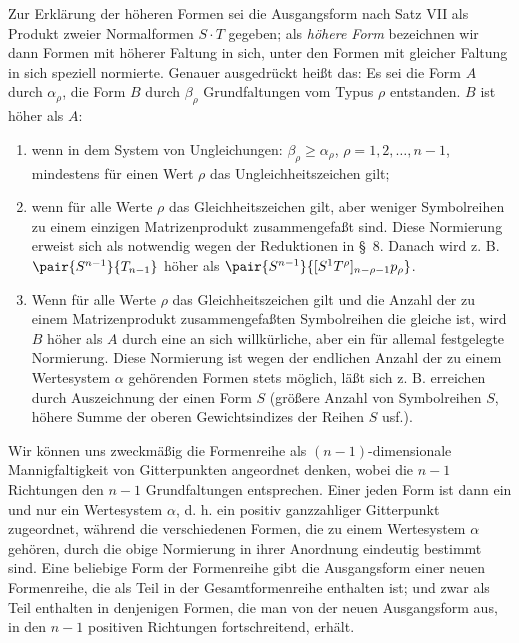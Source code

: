 Zur Erkl\"arung der h\"oheren Formen sei die Ausgangsform nach Satz VII als Produkt zweier Normalformen $S\cdot T$ gegeben; als \emph{h\"ohere Form} bezeichnen wir dann Formen mit h\"oherer Faltung in sich, unter den Formen mit gleicher Faltung in sich speziell normierte. Genauer ausgedr\"uckt hei\ss t das: Es sei die Form $A$ durch $\alpha_\rho$, die Form $B$ durch $\beta_\rho$ Grundfaltungen vom Typus $\rho$ entstanden. $B$ ist h\"oher als $A$:
\begin{enumerate}
\renewcommand{\labelenumi}{\arabic{enumi})}
\item wenn in dem System von Ungleichungen: $\beta_\rho\ge\alpha_\rho$, $\rho=1,2,\ldots,n-1$, mindestens f\"ur einen Wert $\rho$ das Ungleichheitszeichen gilt;
\item wenn f\"ur alle Werte $\rho$ das Gleichheitszeichen gilt, aber weniger Symbolreihen zu einem einzigen Matrizenprodukt zusammengefa\ss t sind. Diese Normierung erweist sich als notwendig wegen der Reduktionen in \S\ 8. Danach wird z. B. $\pair{S^{n-1}}{T_{n-1}}$ h\"oher als $\pair{S^{n-1}}{[S^1T^\rho]_{n-\rho-1}p_\rho}$.
\item Wenn f\"ur alle Werte $\rho$ das Gleichheitszeichen gilt und die Anzahl der zu einem Matrizenprodukt zusammengefa\ss ten Symbolreihen die gleiche ist, wird $B$ h\"oher als $A$ durch eine an sich willk\"urliche, aber ein f\"ur allemal festgelegte Normierung. Diese Normierung ist wegen der endlichen Anzahl der zu einem Wertesystem $\alpha$ geh\"orenden Formen stets m\"oglich, l\"a\ss t sich z. B. erreichen durch Auszeichnung der einen Form $S$ (gr\"o\ss ere Anzahl von Symbolreihen $S$, h\"ohere Summe der oberen Gewichtsindizes der Reihen $S$ usf.).
\end{enumerate}
Wir k\"onnen uns zweckm\"a\ss ig die Formenreihe als $(n-1)$-dimensionale Mannigfaltigkeit von Gitterpunkten angeordnet denken, wobei die $n-1$ Richtungen den $n-1$ Grundfaltungen entsprechen. Einer jeden Form ist dann ein und nur ein Wertesystem $\alpha$, d. h. ein positiv ganzzahliger Gitterpunkt zugeordnet, w\"ahrend die verschiedenen Formen, die zu einem Wertesystem $\alpha$ geh\"oren, durch die obige Normierung in ihrer Anordnung eindeutig bestimmt sind. Eine beliebige Form der Formenreihe gibt die Ausgangsform einer neuen Formenreihe, die als Teil in der Gesamtformenreihe enthalten ist; und zwar als Teil enthalten in denjenigen Formen, die man von der neuen Ausgangsform aus, in den $n-1$ positiven Richtungen fortschreitend, erh\"alt.

